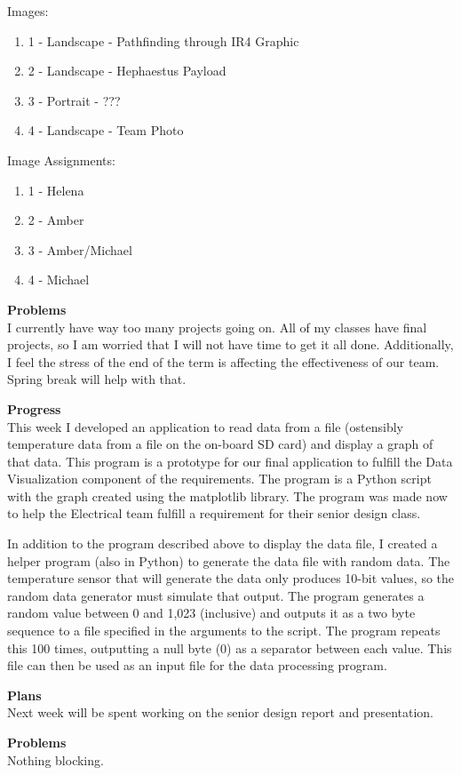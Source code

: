 Images: \\ 
\begin{enumerate}
\item{1 - Landscape - Pathfinding through IR4 Graphic}
\item{2 - Landscape - Hephaestus Payload}
\item{3 - Portrait - ???}
\item{4 - Landscape - Team Photo}
\end{enumerate}

Image Assignments: \\ 
\begin{enumerate}
\item{1 - Helena}
\item{2 - Amber}
\item{3 - Amber/Michael}
\item{4 - Michael}
\end{enumerate}

\textbf{Problems} \\ 
I currently have way too many projects going on. All of my classes have final projects, so I am worried that I will not have time to get it all done. Additionally, I feel the stress of the end of the term is affecting the effectiveness of our team. Spring break will help with that.

\textbf{Progress} \\
This week I developed an application to read data from a file (ostensibly 
temperature data from a file on the on-board SD card) and display a graph of 
that data. This program is a prototype for our final application to fulfill 
the Data Visualization component of the requirements. The program is a Python 
script with the graph created using the matplotlib library. The program was 
made now to help the Electrical team fulfill a requirement for their senior 
design class.

In addition to the program described above to display the data file, I created
a helper program (also in Python) to generate the data file with random data. 
The temperature sensor that will generate the data only produces 10-bit 
values, so the random data generator must simulate that output. The program 
generates a random value between 0 and 1,023 (inclusive) and outputs it as a 
two byte sequence to a file specified in the arguments to the script. The 
program repeats this 100 times, outputting a null byte (0) as a separator 
between each value. This file can then be used as an input file for the data 
processing program.

\textbf{Plans} \\
Next week will be spent working on the senior design report and presentation. 

\textbf{Problems} \\
Nothing blocking. 
